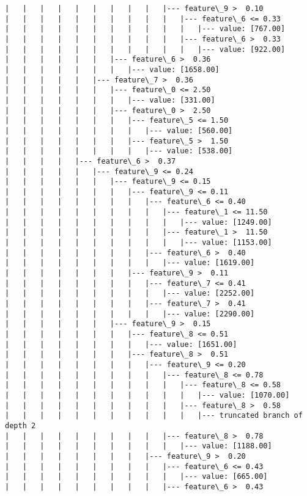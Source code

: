 \documentclass[11pt]{article}
\begin{document}
\begin{Verbatim}[commandchars=\\\{\}]
|   |   |   |   |   |   |   |   |   |--- feature\_9 >  0.10
|   |   |   |   |   |   |   |   |   |   |--- feature\_6 <= 0.33
|   |   |   |   |   |   |   |   |   |   |   |--- value: [767.00]
|   |   |   |   |   |   |   |   |   |   |--- feature\_6 >  0.33
|   |   |   |   |   |   |   |   |   |   |   |--- value: [922.00]
|   |   |   |   |   |   |--- feature\_6 >  0.36
|   |   |   |   |   |   |   |--- value: [1658.00]
|   |   |   |   |   |--- feature\_7 >  0.36
|   |   |   |   |   |   |--- feature\_0 <= 2.50
|   |   |   |   |   |   |   |--- value: [331.00]
|   |   |   |   |   |   |--- feature\_0 >  2.50
|   |   |   |   |   |   |   |--- feature\_5 <= 1.50
|   |   |   |   |   |   |   |   |--- value: [560.00]
|   |   |   |   |   |   |   |--- feature\_5 >  1.50
|   |   |   |   |   |   |   |   |--- value: [538.00]
|   |   |   |   |--- feature\_6 >  0.37
|   |   |   |   |   |--- feature\_9 <= 0.24
|   |   |   |   |   |   |--- feature\_9 <= 0.15
|   |   |   |   |   |   |   |--- feature\_9 <= 0.11
|   |   |   |   |   |   |   |   |--- feature\_6 <= 0.40
|   |   |   |   |   |   |   |   |   |--- feature\_1 <= 11.50
|   |   |   |   |   |   |   |   |   |   |--- value: [1249.00]
|   |   |   |   |   |   |   |   |   |--- feature\_1 >  11.50
|   |   |   |   |   |   |   |   |   |   |--- value: [1153.00]
|   |   |   |   |   |   |   |   |--- feature\_6 >  0.40
|   |   |   |   |   |   |   |   |   |--- value: [1619.00]
|   |   |   |   |   |   |   |--- feature\_9 >  0.11
|   |   |   |   |   |   |   |   |--- feature\_7 <= 0.41
|   |   |   |   |   |   |   |   |   |--- value: [2252.00]
|   |   |   |   |   |   |   |   |--- feature\_7 >  0.41
|   |   |   |   |   |   |   |   |   |--- value: [2290.00]
|   |   |   |   |   |   |--- feature\_9 >  0.15
|   |   |   |   |   |   |   |--- feature\_8 <= 0.51
|   |   |   |   |   |   |   |   |--- value: [1651.00]
|   |   |   |   |   |   |   |--- feature\_8 >  0.51
|   |   |   |   |   |   |   |   |--- feature\_9 <= 0.20
|   |   |   |   |   |   |   |   |   |--- feature\_8 <= 0.78
|   |   |   |   |   |   |   |   |   |   |--- feature\_8 <= 0.58
|   |   |   |   |   |   |   |   |   |   |   |--- value: [1070.00]
|   |   |   |   |   |   |   |   |   |   |--- feature\_8 >  0.58
|   |   |   |   |   |   |   |   |   |   |   |--- truncated branch of depth 2
|   |   |   |   |   |   |   |   |   |--- feature\_8 >  0.78
|   |   |   |   |   |   |   |   |   |   |--- value: [1188.00]
|   |   |   |   |   |   |   |   |--- feature\_9 >  0.20
|   |   |   |   |   |   |   |   |   |--- feature\_6 <= 0.43
|   |   |   |   |   |   |   |   |   |   |--- value: [665.00]
|   |   |   |   |   |   |   |   |   |--- feature\_6 >  0.43

\end{Verbatim}
\end{document}
